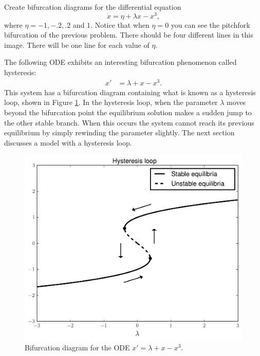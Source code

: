 \begin{problem}
Create bifurcation diagrams for the differential equation
\[\dot{x} = \eta + \lambda x-x^3,\]
where $\eta = -1, -.2, .2$ and $1.$  Notice that when $\eta = 0$ you can see the pitchfork bifurcation of the previous problem.
There should be four different lines in this image.
There will be one line for each value of $\eta$.
\end{problem}

The following ODE exhibits an interesting bifurcation phenomenon called hysteresis:
\begin{align*}
	x' &= \lambda + x - x^3.
\end{align*}
This system has a bifurcation diagram containing what is known as a hysteresis loop, shown in Figure \ref{bifurcation:hysteresis}.
In the hysteresis loop, when the parameter $\lambda$ moves beyond the bifurcation point the equilibrium solution makes a sudden jump to the other stable branch.
When this occurs the system cannot reach its previous equilibrium by simply rewinding the parameter slightly. The next section discusses a model with a hysteresis loop.

\begin{figure}
\centering
\includegraphics[width=\textwidth]{HysteresisBifurcation.pdf}
\caption{Bifurcation diagram for the ODE $x' = \lambda + x - x^3$. }
\label{bifurcation:hysteresis}
\end{figure}

